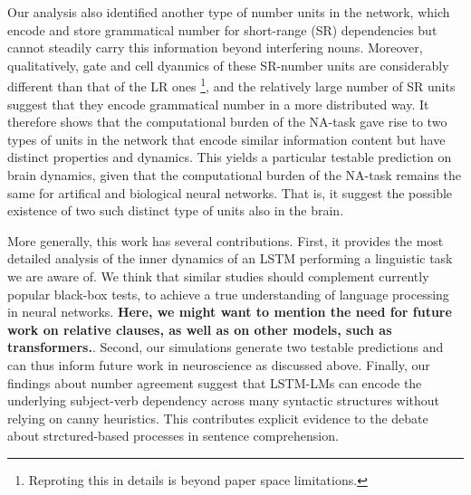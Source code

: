 Our analysis also identified another type of number units in the network, which encode and store grammatical number for short-range (SR) dependencies but cannot steadily carry this information beyond interfering nouns. Moreover, qualitatively, gate and cell dyanmics of these SR-number units are considerably different than that of the LR ones \footnote{Reproting this in details is beyond paper space limitations.}, and the relatively large number of SR units suggest that they encode grammatical number in a more distributed way. It therefore shows that the computational burden of the NA-task gave rise to two types of units in the network that encode similar information content but have distinct properties and dynamics. This yields a particular testable prediction on brain dynamics, given that the computational burden of the NA-task remains the same for artifical and biological neural networks. That is, it suggest the possible existence of two such distinct type of units also in the brain.

More generally, this work has several contributions. First, it provides the most detailed analysis of the inner dynamics of an LSTM performing a linguistic task we are aware of. We think that similar studies should complement currently popular black-box tests, to achieve a true understanding of language processing in neural networks. \textbf{Here, we might want to mention the need for future work on relative clauses, as well as on other  models, such as transformers.}. Second, our simulations generate two testable predictions and can thus inform future work in neuroscience as discussed above. Finally, our findings about number agreement suggest that LSTM-LMs can encode the underlying subject-verb dependency across many syntactic structures without relying on canny heuristics. This contributes explicit evidence to the debate about strctured-based processes in sentence comprehension.



